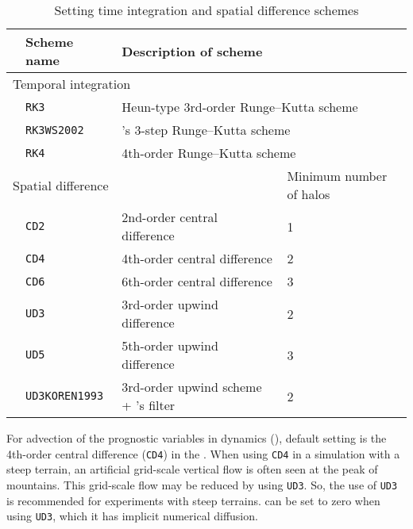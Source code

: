 \begin{table}[bth]
\begin{center}
  \caption{Setting time integration and spatial difference schemes}
  \label{tab:nml_atm_dyn}
  \begin{tabularx}{150mm}{lllX} \hline
    \rowcolor[gray]{0.9} & \multicolumn{1}{l}{Scheme name} & \multicolumn{1}{l}{Description of scheme} & \\ \hline
    \multicolumn{3}{l}{Temporal integration} &  \\ \hline
    & \multicolumn{1}{l}{\verb|RK3|} & \multicolumn{2}{l}{Heun-type 3rd-order Runge--Kutta scheme} \\
    & \multicolumn{1}{l}{\verb|RK3WS2002|} & \multicolumn{2}{l}{\citet{Wicker_2002}'s 3-step Runge--Kutta scheme} \\
    & \multicolumn{1}{l}{\verb|RK4|} & \multicolumn{2}{l}{4th-order Runge--Kutta scheme} \\
    \hline
    \multicolumn{3}{l}{Spatial difference} & Minimum number of halos\\ \hline
    & \multicolumn{1}{l}{\verb|CD2|} & \multicolumn{1}{l}{2nd-order central difference} & \multicolumn{1}{l}{1}\\
    & \multicolumn{1}{l}{\verb|CD4|} & \multicolumn{1}{l}{4th-order central difference} & \multicolumn{1}{l}{2}\\
    & \multicolumn{1}{l}{\verb|CD6|} & \multicolumn{1}{l}{6th-order central difference} & \multicolumn{1}{l}{3}\\
    & \multicolumn{1}{l}{\verb|UD3|} & \multicolumn{1}{l}{3rd-order upwind difference} & \multicolumn{1}{l}{2}\\
    & \multicolumn{1}{l}{\verb|UD5|} & \multicolumn{1}{l}{5th-order upwind difference} & \multicolumn{1}{l}{3}\\
    & \multicolumn{1}{l}{\verb|UD3KOREN1993|} & \multicolumn{1}{l}{3rd-order upwind scheme + \citet{Koren_1993}'s filter} & \multicolumn{1}{l}{2}\\
\hline
  \end{tabularx}
\end{center}
\end{table}

For advection of the prognostic variables in dynamics (),
default setting is the 4th-order central difference (\verb|CD4|) in the \scalerm.
When using \verb|CD4| in a simulation with a steep terrain,
an artificial grid-scale vertical flow is often seen at the peak of mountains.
This grid-scale flow may be reduced by using \verb|UD3|.
So, the use of \verb|UD3| is recommended for experiments with steep terrains.
 can be set to zero when using \verb|UD3|, which it has implicit numerical diffusion.

